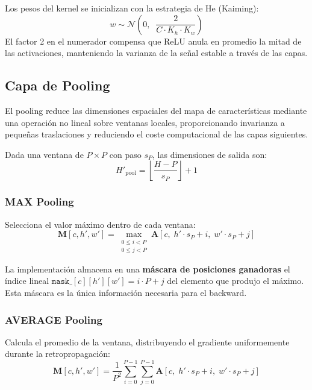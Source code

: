 \documentclass[12pt,a4paper]{article}
\begin{document}
Los pesos del kernel se inicializan con la estrategia de He (Kaiming):
\begin{equation}
  w \sim \mathcal{N}\!\left(0,\;\; \frac{2}{C \cdot K_h \cdot K_w}\right)
\end{equation}
El factor 2 en el numerador compensa que ReLU anula en promedio la mitad de las
activaciones, manteniendo la varianza de la señal estable a través de las capas.

\subsection{Capa de Pooling}

El pooling reduce las dimensiones espaciales del mapa de características mediante una
operación no lineal sobre ventanas locales, proporcionando invarianza a pequeñas
traslaciones y reduciendo el coste computacional de las capas siguientes.

Dada una ventana de $P \times P$ con paso $s_P$, las dimensiones de salida son:
\begin{equation}
  H'_{\mathrm{pool}} = \left\lfloor \frac{H - P}{s_P} \right\rfloor + 1
\end{equation}

\subsubsection{MAX Pooling}

Selecciona el valor máximo dentro de cada ventana:
\begin{equation}
  \mathbf{M}[c, h', w'] = \max_{\substack{0 \le i < P \\ 0 \le j < P}}
  \mathbf{A}[c,\; h' \cdot s_P + i,\; w' \cdot s_P + j]
\end{equation}

La implementación almacena en una \textbf{máscara de posiciones ganadoras} el índice
lineal $\texttt{mask\_}[c][h'][w'] = i \cdot P + j$ del elemento que produjo el máximo.
Esta máscara es la única información necesaria para el backward.

\subsubsection{AVERAGE Pooling}

Calcula el promedio de la ventana, distribuyendo el gradiente uniformemente durante
la retropropagación:
\begin{equation}
  \mathbf{M}[c, h', w'] = \frac{1}{P^2}
  \sum_{i=0}^{P-1} \sum_{j=0}^{P-1} \mathbf{A}[c,\; h' \cdot s_P + i,\; w' \cdot s_P + j]
\end{equation}
\end{document}
